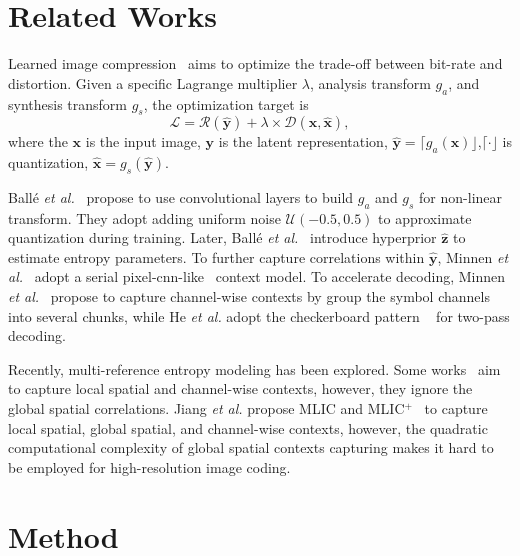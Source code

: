 \documentclass{article}
\theoremstyle{plain}
\theoremstyle{definition}
\theoremstyle{remark}
\begin{document}
  \section{Related Works}
  \label{sec:related}
  Learned image compression~\cite{theis2017lossy, balle2020nonlinear} aims to optimize the trade-off between 
  bit-rate and distortion. Given a specific Lagrange multiplier $\lambda$,
  analysis transform $g_a$, and synthesis transform $g_s$,
  the optimization target is 
  \begin{equation}
      \mathcal{L} = \mathcal{R}(\hat{\boldsymbol y}) + \lambda \times \mathcal{D}(\boldsymbol{x}, \hat{\boldsymbol{x}}),
  \end{equation}
  where the $\boldsymbol{x}$ is the input image, $\boldsymbol{y}$ is the
  latent representation, $\hat{\boldsymbol y} = \lceil g_a(\boldsymbol x) \rfloor$,$\lceil \cdot \rfloor$ is 
  quantization, $\hat{\boldsymbol x} = g_s(\hat{\boldsymbol y})$.\par
  Ball{\'e} \textit{et al.}~\cite{balle2016end} propose to use convolutional layers
  to build $g_a$ and $g_s$ for non-linear transform. They adopt adding 
  uniform noise $\mathcal{U}(-0.5, 0.5)$ to approximate quantization during training.
  Later, Ball{\'e} \textit{et al.}~\cite{balle2018variational} introduce hyperprior $\hat{\boldsymbol z}$ to estimate entropy parameters.
  To further capture correlations within $\hat{\boldsymbol{y}}$,
  Minnen \textit{et al.}~\cite{minnen2018joint} adopt a serial
  pixel-cnn-like~\cite{van2016conditional} context model.
  To accelerate decoding,
  Minnen \textit{et al.}~\cite{minnen2020channel} propose to capture
  channel-wise contexts by group the symbol channels into several chunks,
  while He \textit{et al.} adopt the checkerboard pattern
  ~\cite{he2021checkerboard} for two-pass decoding.\par
  Recently, multi-reference entropy modeling has been explored.
  Some works~\cite{ma2021cross,he2022elic} aim to capture local spatial and channel-wise contexts,
  however, they ignore the global spatial correlations.
  Jiang \textit{et al.} propose MLIC and MLIC$^+$~\cite{jiang2022mlic}
  to capture local spatial, global spatial, and channel-wise contexts, 
  however, the quadratic computational complexity of global spatial contexts
  capturing makes it hard to be employed for high-resolution image coding.
  \section{Method}
  \label{sec:method}
\end{document}
